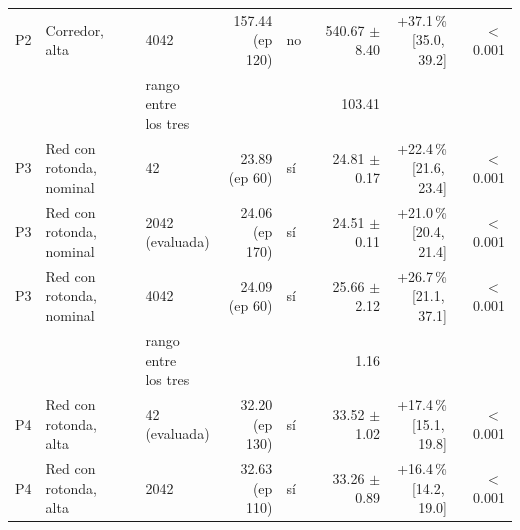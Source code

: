 \begin{table}[H]
\begin{tabular}{lllrlrrr}
P2 & \makecell[l]{Corredor,\\{}alta} & 4042 & \makecell[r]{157.44\\{}(ep 120)} & no & \makecell[r]{540.67\\{}$\pm$ 8.40} & \makecell[r]{+37.1\,\%\\{}[35.0,\,39.2]} & $<$\,0.001 \\
 & & \makecell[l]{rango entre\\{}los tres} & & & 103.41 & & \\
P3 & \makecell[l]{Red con rotonda,\\{}nominal} & 42 & \makecell[r]{23.89\\{}(ep 60)} & sí & \makecell[r]{24.81\\{}$\pm$ 0.17} & \makecell[r]{+22.4\,\%\\{}[21.6,\,23.4]} & $<$\,0.001 \\
P3 & \makecell[l]{Red con rotonda,\\{}nominal} & \makecell[l]{2042\\{}(evaluada)} & \makecell[r]{24.06\\{}(ep 170)} & sí & \makecell[r]{24.51\\{}$\pm$ 0.11} & \makecell[r]{+21.0\,\%\\{}[20.4,\,21.4]} & $<$\,0.001 \\
P3 & \makecell[l]{Red con rotonda,\\{}nominal} & 4042 & \makecell[r]{24.09\\{}(ep 60)} & sí & \makecell[r]{25.66\\{}$\pm$ 2.12} & \makecell[r]{+26.7\,\%\\{}[21.1,\,37.1]} & $<$\,0.001 \\
 & & \makecell[l]{rango entre\\{}los tres} & & & 1.16 & & \\
P4 & \makecell[l]{Red con rotonda,\\{}alta} & \makecell[l]{42\\{}(evaluada)} & \makecell[r]{32.20\\{}(ep 130)} & sí & \makecell[r]{33.52\\{}$\pm$ 1.02} & \makecell[r]{+17.4\,\%\\{}[15.1,\,19.8]} & $<$\,0.001 \\
P4 & \makecell[l]{Red con rotonda,\\{}alta} & 2042 & \makecell[r]{32.63\\{}(ep 110)} & sí & \makecell[r]{33.26\\{}$\pm$ 0.89} & \makecell[r]{+16.4\,\%\\{}[14.2,\,19.0]} & $<$\,0.001 \\

\end{tabular}
\end{table}
